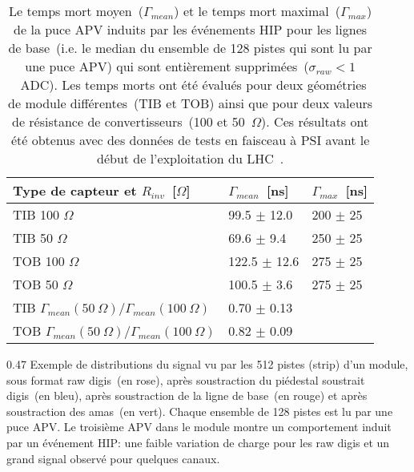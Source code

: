 \begin{table}[h]
\begin{center}
\begin{tabular}{|l|l|l|}
\hline
Type de capteur et $R_{inv}$~[$\Omega$] & $\Gamma_{mean}$~[ns]  & $\Gamma_{max}$~[ns] \\
\hline
\hline
TIB 100 $\Omega$ & 99.5 $\pm$ 12.0 & 200 $\pm$ 25 \\
TIB 50  $\Omega$ & 69.6 $\pm$ 9.4 & 250 $\pm$ 25 \\
TOB 100  $\Omega$ & 122.5 $\pm$ 12.6 & 275 $\pm$ 25 \\
TOB 50 $\Omega$  & 100.5 $\pm$ 3.6 & 275 $\pm$ 25 \\
\hline
TIB $\Gamma_{mean}(50~\Omega )/\Gamma_{mean}(100~\Omega)$ &  0.70 $\pm$ 0.13  & \\
TOB $\Gamma_{mean}(50~\Omega )/\Gamma_{mean}(100~\Omega)$ &  0.82 $\pm$ 0.09 & \\
\hline
\end{tabular}
\caption[Table caption text]{Le temps mort moyen~($\Gamma_{mean} $) et le temps mort maximal~($\Gamma_{max}$) de la puce APV induits par les événements HIP pour les lignes de base~(i.e. le median du ensemble de 128 pistes qui sont lu par une puce APV) qui sont entièrement supprimées~($\sigma_{raw} <1 $~ADC). Les temps morts ont été évalués pour deux géométries de module différentes~(TIB et TOB) ainsi que pour deux valeurs de résistance de convertisseurs~(100 et 50~$\Omega$). Ces résultats ont été obtenus avec des données de tests en faisceau à PSI avant le début de l'exploitation du LHC~\cite{Bainbridge:2004jc}.}
\label{tab:tableDeadtimes2}
\end{center}
\end{table}


                 {0.47}
                 {Exemple de distributions du signal vu par les 512 pistes (strip) d'un module, sous format raw digis~(en rose), après soustraction du piédestal soustrait digis~(en bleu), après soustraction de la ligne de base~(en rouge) et après soustraction des amas~(en vert). Chaque ensemble de 128 pistes est lu par une puce APV. Le troisième APV dans le module montre un comportement induit par un événement HIP: une faible variation de charge pour les raw digis et un grand signal observé pour quelques canaux.}       %

